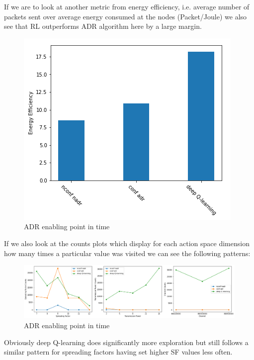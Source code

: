 If we are to look at another metric from \cite{rl_lora_original} energy efficiency, i.e. average 
number of packets sent over average energy consumed at
the nodes (Packet/Joule) we also see that RL outperforms 
ADR algorithm here by a large margin.

\begin{figure}[H]
\centering
\hspace*{-0.5cm}  
\includegraphics[scale=0.70]{plots/adr/energy_efficiency.PNG}
  \caption{ADR enabling point in time}
\end{figure}


If we also look at the counts plots which display
for each action space dimension how many times
a particular value was visited we can see the following patterns:

\begin{figure}[H]
\centering
\hspace*{-1.5cm}  
\includegraphics[scale=0.40]{plots/adr/adr_inspection_counts.png}
  \caption{ADR enabling point in time}
\end{figure}

Obviously deep Q-learning does significantly more
exploration but still follows a similar pattern for spreading factors having set higher SF values less
often. \\

